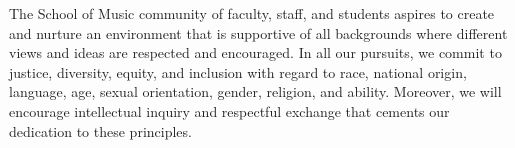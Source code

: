 The School of Music community of faculty, staff, and students aspires to create and nurture an environment that is supportive of all backgrounds where different views and ideas are respected and encouraged. In all our pursuits, we commit to justice, diversity, equity, and inclusion with regard to race, national origin, language, age, sexual orientation, gender, religion, and ability. Moreover, we will encourage intellectual inquiry and respectful exchange that cements our dedication to these principles.
